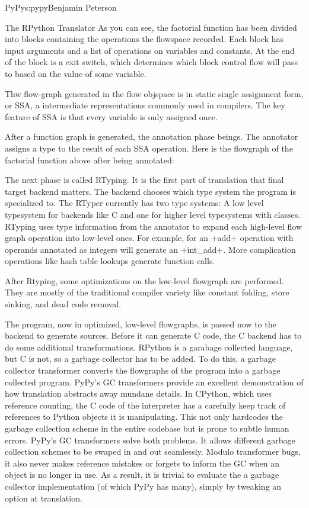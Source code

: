 \begin{aosachapter}{PyPy}{s:pypy}{Benjamin Peterson}
\begin{aosasect1}{The RPython Translator}
As you can see, the factorial function has been divided into blocks containing
the operations the flowspace recorded. Each block has input arguments and a list
of operations on variables and constants. At the end of the block is a exit
switch, which determines which block control flow will pass to based on the
value of some variable.

Thw flow-graph generated in the flow objspace is in static single assignment
form, or SSA, a intermediate representations commonly used in compilers. The key
feature of SSA is that every variable is only assigned once.

After a function graph is generated, the annotation phase beings. The annotator
assigns a type to the result of each SSA operation. Here is the flowgraph of the
factorial function above after being annotated:


The next phase is called RTyping. It is the first part of translation that final
target backend matters. The backend chooses which type system the program is
specialized to. The RTyper currently has two type systems: A low level
typesystem for backends like C and one for higher level typesystems with
classes. RTyping uses type information from the annotator to expand each
high-level flow graph operation into low-level ones. For example, for an +add+
operation with operands annotated as integers will generate an +int\_add+. More
complication operations like hash table lookups generate function calls.

After Rtyping, some optimizations on the low-level flowgraph are performed. They
are mostly of the traditional compiler variety like constant folding, store
sinking, and dead code removal.

The program, now in optimized, low-level flowgraphs, is passed now to the
backend to generate sources. Before it can generate C code, the C backend has to
do some additional transformations. RPython is a garabage collected language,
but C is not, so a garbage collector has to be added. To do this, a garbage
collector transformer converts the flowgraphs of the program into a garbage
collected program. PyPy's GC transformers provide an excellent demonstration of
how translation abstracts away mundane details. In CPython, which uses reference
counting, the C code of the interpreter has a carefully keep track of references
to Python objects it is manipulating. This not only hardcodes the garbage
collection scheme in the entire codebase but is prone to subtle human
errors. PyPy's GC transformers solve both problems. It allows different garbage
collection schemes to be swaped in and out seamlessly. Modulo transformer bugs,
it also never makes reference mistakes or forgets to inform the GC when an
object is no longer in use. As a result, it is trivial to evaluate the a garbage
collector implementation (of which PyPy has many), simply by tweaking an option
at translation.


\end{aosasect1}
\end{aosachapter}

